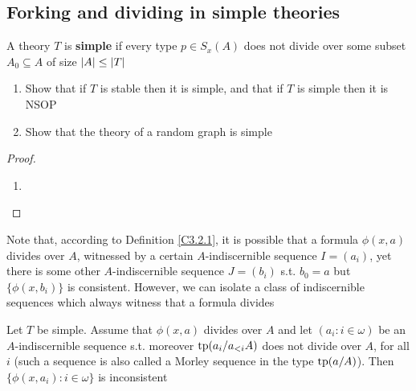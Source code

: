 \documentclass[11pt]{article}
\begin{document}
\subsection{Forking and dividing in simple theories}
\label{sec:org74d7e4b}
\begin{definition}[]
A theory \(T\) is \textbf{simple} if every type \(p\in S_x(A)\) does not divide over some
subset \(A_0\subseteq A\) of size \(\abs{A}\le\abs{T}\)
\end{definition}

\begin{exercise}
\label{Problem10}
\begin{enumerate}
\item Show that if \(T\) is stable then it is simple, and that if \(T\) is simple then it is NSOP
\item Show that the theory of a random graph is simple
\end{enumerate}
\end{exercise}

\begin{proof}
\begin{enumerate}
\item 
\end{enumerate}
\end{proof}

Note that, according to Definition \ref{C3.2.1}, it is possible that a formula \(\phi(x,a)\) divides
over \(A\), witnessed by a certain \(A\)-indiscernible sequence \(I=(a_i)\), yet there is some
other \(A\)-indiscernible sequence \(J=(b_i)\) s.t. \(b_0=a\) but \(\{\phi(x,b_i)\}\) is consistent.
However, we can isolate a class of indiscernible sequences which always witness that a formula
divides

\begin{lemma}
Let \(T\) be simple. Assume that \(\phi(x,a)\) divides over \(A\) and let \((a_i:i\in\omega)\) be
an \(A\)-indiscernible sequence s.t. moreover \(\operatorname{tp}(a_i/a_{<i}A)\) does not divide over \(A\), for
all \(i\) (such a sequence is also called a Morley sequence in the type \(\operatorname{tp}(a/A)\)).
Then \(\{\phi(x,a_i):i\in\omega\}\) is inconsistent
\end{lemma}
\end{document}
